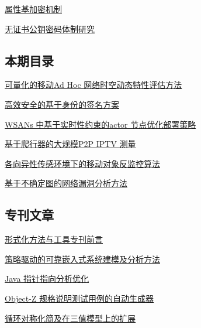 \documentclass[a4paper]{article}
\begin{document}
\href{http://www.jos.org.cn/ch/reader/download_pdf.aspx?file_no=3993&year_id=2011&quarter_id=6&falg=1}{属性基加密机制}

\href{http://www.jos.org.cn/ch/reader/download_pdf.aspx?file_no=4007&year_id=2011&quarter_id=6&falg=1}{无证书公钥密码体制研究}

\subsection{本期目录}
\href{http://www.jos.org.cn/ch/reader/download_pdf.aspx?file_no=3966&year_id=2011&quarter_id=6&falg=1}{可量化的移动Ad Hoc 网络时空动态特性评估方法}

\href{http://www.jos.org.cn/ch/reader/download_pdf.aspx?file_no=4002&year_id=2011&quarter_id=6&falg=1}{高效安全的基于身份的签名方案}

\href{http://www.jos.org.cn/ch/reader/download_pdf.aspx?file_no=3826&year_id=2011&quarter_id=6&falg=1}{WSANs 中基于实时性约束的actor 节点优化部署策略}

\href{http://www.jos.org.cn/ch/reader/download_pdf.aspx?file_no=3849&year_id=2011&quarter_id=6&falg=1}{基于爬行器的大规模P2P IPTV 测量}

\href{http://www.jos.org.cn/ch/reader/download_pdf.aspx?file_no=3821&year_id=2011&quarter_id=6&falg=1}{各向异性传感环境下的移动对象反监控算法}

\href{http://www.jos.org.cn/ch/reader/download_pdf.aspx?file_no=3819&year_id=2011&quarter_id=6&falg=1}{基于不确定图的网络漏洞分析方法}

\subsection{专刊文章}
\href{http://www.jos.org.cn/ch/reader/download_pdf.aspx?file_no=4036&year_id=2011&quarter_id=6&falg=1}{形式化方法与工具专刊前言}

\href{http://www.jos.org.cn/ch/reader/download_pdf.aspx?file_no=4026&year_id=2011&quarter_id=6&falg=1}{策略驱动的可靠嵌入式系统建模及分析方法}

\href{http://www.jos.org.cn/ch/reader/download_pdf.aspx?file_no=4025&year_id=2011&quarter_id=6&falg=1}{Java 指针指向分析优化}

\href{http://www.jos.org.cn/ch/reader/download_pdf.aspx?file_no=4021&year_id=2011&quarter_id=6&falg=1}{Object-Z 规格说明测试用例的自动生成器}

\href{http://www.jos.org.cn/ch/reader/download_pdf.aspx?file_no=4020&year_id=2011&quarter_id=6&falg=1}{循环对称化简及在三值模型上的扩展}
\end{document}

